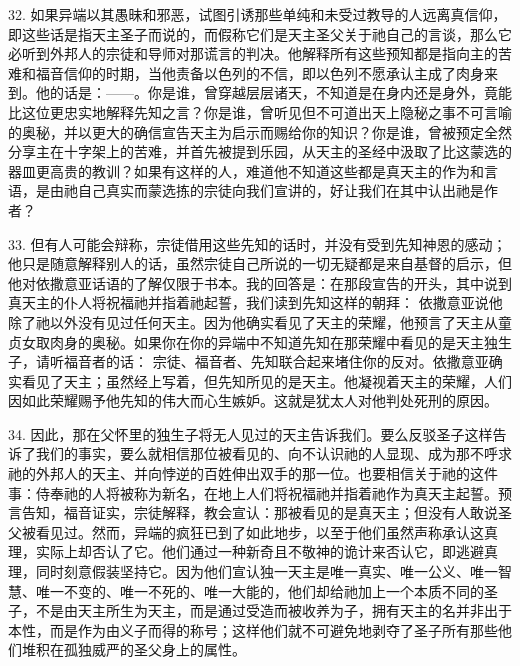 32. 如果异端以其愚昧和邪恶，试图引诱那些单纯和未受过教导的人远离真信仰，即这些话是指天主圣子而说的，而假称它们是天主圣父关于祂自己的言谈，那么它必听到外邦人的宗徒和导师对那谎言的判决。他解释所有这些预知都是指向主的苦难和福音信仰的时期，当他责备以色列的不信，即以色列不愿承认主成了肉身来到。他的话是：——。你是谁，曾穿越层层诸天，不知道是在身内还是身外，竟能比这位更忠实地解释先知之言？你是谁，曾听见但不可道出天上隐秘之事不可言喻的奥秘，并以更大的确信宣告天主为启示而赐给你的知识？你是谁，曾被预定全然分享主在十字架上的苦难，并首先被提到乐园，从天主的圣经中汲取了比这蒙选的器皿更高贵的教训？如果有这样的人，难道他不知道这些都是真天主的作为和言语，是由祂自己真实而蒙选拣的宗徒向我们宣讲的，好让我们在其中认出祂是作者？\par

33. 但有人可能会辩称，宗徒借用这些先知的话时，并没有受到先知神恩的感动；他只是随意解释别人的话，虽然宗徒自己所说的一切无疑都是来自基督的启示，但他对依撒意亚话语的了解仅限于书本。我的回答是：在那段宣告的开头，其中说到真天主的仆人将祝福祂并指着祂起誓，我们读到先知这样的朝拜：  依撒意亚说他除了祂以外没有见过任何天主。因为他确实看见了天主的荣耀，他预言了天主从童贞女取肉身的奥秘。如果你在你的异端中不知道先知在那荣耀中看见的是天主独生子，请听福音者的话：  宗徒、福音者、先知联合起来堵住你的反对。依撒意亚确实看见了天主；虽然经上写着，但先知所见的是天主。他凝视着天主的荣耀，人们因如此荣耀赐予他先知的伟大而心生嫉妒。这就是犹太人对他判处死刑的原因。\par

34. 因此，那在父怀里的独生子将无人见过的天主告诉我们。要么反驳圣子这样告诉了我们的事实，要么就相信那位被看见的、向不认识祂的人显现、成为那不呼求祂的外邦人的天主、并向悖逆的百姓伸出双手的那一位。也要相信关于祂的这件事：侍奉祂的人将被称为新名，在地上人们将祝福祂并指着祂作为真天主起誓。预言告知，福音证实，宗徒解释，教会宣认：那被看见的是真天主；但没有人敢说圣父被看见过。然而，异端的疯狂已到了如此地步，以至于他们虽然声称承认这真理，实际上却否认了它。他们通过一种新奇且不敬神的诡计来否认它，即逃避真理，同时刻意假装坚持它。因为他们宣认独一天主是唯一真实、唯一公义、唯一智慧、唯一不变的、唯一不死的、唯一大能的，他们却给祂加上一个本质不同的圣子，不是由天主所生为天主，而是通过受造而被收养为子，拥有天主的名并非出于本性，而是作为由义子而得的称号；这样他们就不可避免地剥夺了圣子所有那些他们堆积在孤独威严的圣父身上的属性。\par

